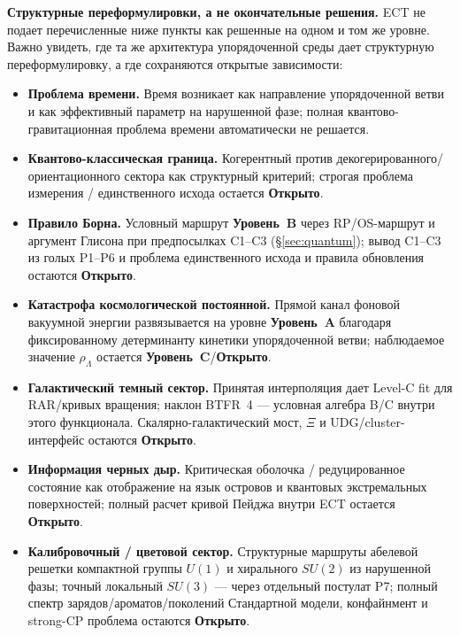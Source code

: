 \documentclass[11pt,a4paper]{article}
\newcommand{\statA}{\textbf{Уровень~A}}
\newcommand{\statB}{\textbf{Уровень~B}}
\newcommand{\statC}{\textbf{Уровень~C}}
\newcommand{\statO}{\textbf{Открыто}}
\begin{document}
\textbf{Структурные переформулировки, а не окончательные решения.}
ECT не подает перечисленные ниже пункты как решенные на одном и
том же уровне. Важно увидеть, где та же архитектура упорядоченной
среды дает структурную переформулировку, а где сохраняются
открытые зависимости:

\begin{itemize}[leftmargin=1.4em,itemsep=2pt]
\item \textbf{Проблема времени.}
      Время возникает как направление упорядоченной ветви и как
      эффективный параметр на нарушенной фазе; полная
      квантово-гравитационная проблема времени автоматически не
      решается.
\item \textbf{Квантово-классическая граница.}
      Когерентный против декогерированного/ориентационного
      сектора как структурный критерий; строгая проблема
      измерения / единственного исхода остается \statO.
\item \textbf{Правило Борна.}
      Условный маршрут \statB{} через RP/OS-маршрут и аргумент
      Глисона при
      предпосылках C1--C3 (\S\ref{sec:quantum});
      вывод C1--C3 из голых P1--P6 и проблема
      единственного исхода и правила обновления остаются \statO.
\item \textbf{Катастрофа космологической постоянной.}
      Прямой канал фоновой вакуумной энергии развязывается на уровне
      \statA{} благодаря фиксированному детерминанту кинетики
      упорядоченной ветви; наблюдаемое значение $\rho_\Lambda$
      остается \statC/\statO.
\item \textbf{Галактический темный сектор.}
      Принятая интерполяция дает Level-C fit для RAR/кривых
      вращения; наклон BTFR~4 — условная алгебра B/C внутри этого
      функционала.  Скалярно-галактический мост, $\Xi$ и
      UDG/cluster-интерфейс остаются \statO.
\item \textbf{Информация черных дыр.}
      Критическая оболочка / редуцированное состояние как
      отображение на язык островов и квантовых экстремальных
      поверхностей;
      полный расчет кривой Пейджа внутри ECT остается \statO.
\item \textbf{Калибровочный / цветовой сектор.}
      Структурные маршруты абелевой решетки компактной группы
      $U(1)$ и
      хирального $SU(2)$ из нарушенной фазы; точный локальный
      $SU(3)$ — через отдельный постулат P7; полный спектр
      зарядов/ароматов/поколений Стандартной модели, конфайнмент и
      strong-CP проблема остаются \statO.
\end{itemize}
\end{document}

